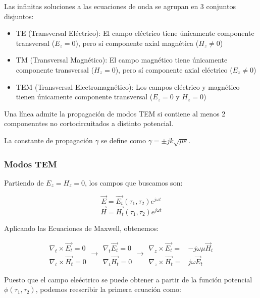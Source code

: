 \documentclass[12pt]{article}
\begin{document}
Las infinitas soluciones a las ecuaciones de onda se agrupan en 3 conjuntos disjuntos: 
\begin{itemize}
	\item TE (Transversal El\'ectrico): El campo el\'ectrico tiene \'unicamente componente transversal ($E_z = 0$), pero s\'i componente axial magn\'etica ($H_z \neq 0$)
	\item TM (Transversal Magn\'etico): El campo magn\'etico tiene \'unicamente componente transversal ($H_z = 0$), pero s\'i componente axial el\'ectrico ($E_z \neq 0$)
	\item TEM (Transversal Electromagn\'etico): Los campos el\'ectrico y  magn\'etico tienen \'unicamente componente transversal ($E_z = 0$ y $H_z = 0$)
\end{itemize}


Una l\'inea admite la propagaci\'on de modos TEM si contiene al menos 2 componenntes no cortocircuitados a distinto potencial.

La constante de propagaci\'on $\gamma$ se define como $\gamma = \pm jk\sqrt{\mu\varepsilon}$.

\subsubsection{Modos TEM}

Partiendo de $E_z = H_z = 0$, los campos que buscamos son:

$$\vec{E} = \vec{E_t}(\tau_1,\tau_2) e^{j\omega t}$$
$$\vec{H} = \vec{H_t}(\tau_1,\tau_2) e^{j\omega t}$$

Aplicando las Ecuaciones de Maxwell, obtenemos: 

$$
\begin{array}{l}
    \nabla_t \times \vec{E_t} = 0 \\
    \nabla_t \times \vec{H_t} = 0
\end{array}
\rightarrow
\begin{array}{l}
        \nabla_t \vec{E_t} = 0 \\
        \nabla_t \vec{H_t} = 0 \end{array}
\rightarrow
\begin{array}{lr}
        \nabla_z \times \vec{E_t} = & -j\omega\mu\vec{H}_t \\
        \nabla_z \times \vec{H_t} = & j\omega\vec{E}_t \end{array}$$
        
Puesto que el campo ele\'ectrico se puede obtener a partir de la funci\'on potencial $\phi(\tau_1, \tau_2)$, podemos reescribir la primera ecuaci\'on como:
\end{document}
